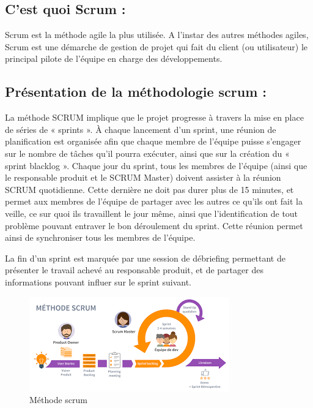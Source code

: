 \documentclass[a4paper,12pt]{report}
\begin{document}
	\subsection{C'est quoi Scrum :}
	Scrum est la méthode agile la plus utilisée. A l'instar des autres méthodes agiles, Scrum est une démarche de gestion de projet qui fait du client (ou utilisateur) le principal pilote de l'équipe en charge des développements.
	\subsection{Présentation de la méthodologie scrum :}
	La méthode SCRUM implique que le projet progresse à travers la mise en place de séries de « sprints ». À chaque lancement d’un sprint, une réunion de planification est organisée afin que chaque membre de l’équipe puisse s’engager sur le nombre de tâches qu’il pourra exécuter, ainsi que sur la création du « sprint blacklog ».
	Chaque jour du sprint, tous les membres de l’équipe (ainsi que le responsable produit et le SCRUM Master) doivent assister à la réunion SCRUM quotidienne. Cette dernière ne doit pas durer plus de 15 minutes, et permet aux membres de l’équipe de partager avec les autres ce qu’ils ont fait la veille, ce sur quoi ils travaillent le jour même, ainsi que l’identification de tout problème pouvant entraver le bon déroulement du sprint. Cette réunion permet ainsi de synchroniser tous les membres de l’équipe.
	\par
	La fin d’un sprint est marquée par une session de débriefing permettant de présenter le travail achevé au responsable produit, et de partager des informations pouvant influer sur le sprint suivant.
	\begin{figure} [h]
		\begin{center}
			\centering
			\includegraphics[width=1\linewidth]{Images/téléchargement (4)}
		\end{center}
		\caption{Méthode scrum}
	\end{figure}
\end{document}
